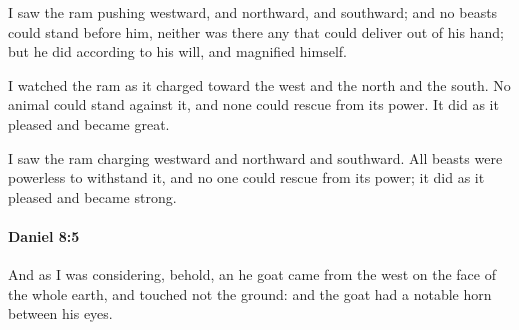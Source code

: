 			\begin{versebox}
					\item[BHS] 
					\item[LXX] 
					\item[ASV] I saw the ram pushing westward, and northward, and southward; and no beasts could stand before him, neither was there any that could deliver out of his hand; but he did according to his will, and magnified himself.
					\item[NIV] I watched the ram as it charged toward the west and the north and the south. No animal could stand against it, and none could rescue from its power. It did as it pleased and became great.
					\item[NRSV] I saw the ram charging westward and northward and southward. All beasts were powerless to withstand it, and no one could rescue from its power; it did as it pleased and became strong.
			\end{versebox}

		\paragraph{Daniel 8:5} %
			\label{DANIEL-8-5}

			And as I was considering, behold, an he goat came from the west on the face of the whole earth, and touched not the ground: and the goat had a notable horn between his eyes.

